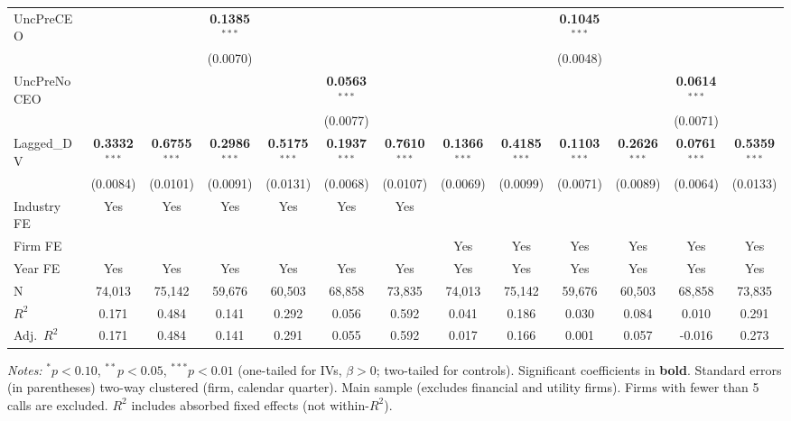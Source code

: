 \begin{landscape}
\begin{table}[H]
\begin{tabular}{lcccccccccccc}
UncPreCEO &  &  & \textbf{0.1385}$^{***}$ &  &  &  &  &  & \textbf{0.1045}$^{***}$ &  &  &  \\
 &  &  & (0.0070) &  &  &  &  &  & (0.0048) &  &  &  \\
UncPreNoCEO &  &  &  &  & \textbf{0.0563}$^{***}$ &  &  &  &  &  & \textbf{0.0614}$^{***}$ &  \\
 &  &  &  &  & (0.0077) &  &  &  &  &  & (0.0071) &  \\
Lagged\_DV & \textbf{0.3332}$^{***}$ & \textbf{0.6755}$^{***}$ & \textbf{0.2986}$^{***}$ & \textbf{0.5175}$^{***}$ & \textbf{0.1937}$^{***}$ & \textbf{0.7610}$^{***}$ & \textbf{0.1366}$^{***}$ & \textbf{0.4185}$^{***}$ & \textbf{0.1103}$^{***}$ & \textbf{0.2626}$^{***}$ & \textbf{0.0761}$^{***}$ & \textbf{0.5359}$^{***}$ \\
 & (0.0084) & (0.0101) & (0.0091) & (0.0131) & (0.0068) & (0.0107) & (0.0069) & (0.0099) & (0.0071) & (0.0089) & (0.0064) & (0.0133) \\
\midrule
Industry FE & Yes & Yes & Yes & Yes & Yes & Yes &  &  &  &  &  &  \\
Firm FE &  &  &  &  &  &  & Yes & Yes & Yes & Yes & Yes & Yes \\
Year FE & Yes & Yes & Yes & Yes & Yes & Yes & Yes & Yes & Yes & Yes & Yes & Yes \\
\midrule
N & 74,013 & 75,142 & 59,676 & 60,503 & 68,858 & 73,835 & 74,013 & 75,142 & 59,676 & 60,503 & 68,858 & 73,835 \\
$R^2$ & 0.171 & 0.484 & 0.141 & 0.292 & 0.056 & 0.592 & 0.041 & 0.186 & 0.030 & 0.084 & 0.010 & 0.291 \\
Adj.~$R^2$ & 0.171 & 0.484 & 0.141 & 0.291 & 0.055 & 0.592 & 0.017 & 0.166 & 0.001 & 0.057 & -0.016 & 0.273 \\
\bottomrule
\end{tabular}
\begin{minipage}{\linewidth}
\vspace{2pt}\scriptsize
\textit{Notes:} $^{*}p<0.10$, $^{**}p<0.05$, $^{***}p<0.01$ (one-tailed for IVs, $\beta > 0$; two-tailed for controls).
 Significant coefficients in \textbf{bold}.
 Standard errors (in parentheses) two-way clustered (firm, calendar quarter).
 Main sample (excludes financial and utility firms). Firms with fewer than 5 calls are excluded.
 $R^2$ includes absorbed fixed effects (not within-$R^2$).
\end{minipage}
\end{table}
\end{landscape}